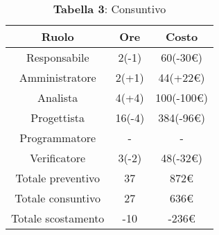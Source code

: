 \begin{table}[H]
	\centering
	\renewcommand{\arraystretch}{1.5}
	\begin{tabular}{|c|c|c|}
		\hline
		\rowcolor{lighter-grayer}
		Ruolo & Ore & Costo \\ \hline
		Responsabile & 2(-1) & 60(-30\euro) \\ \hline
		Amministratore & 2(+1) & 44(+22\euro) \\ \hline
		Analista & 4(+4) & 100(-100\euro) \\ \hline
		Progettista & 16(-4) & 384(-96\euro) \\ \hline
		Programmatore & - & - \\ \hline
		Verificatore & 3(-2) & 48(-32\euro) \\ \hline
		Totale preventivo & 37 & 872\euro \\ \hline
		Totale consuntivo & 27 & 636\euro \\ \hline
		Totale scostamento & -10 & -236\euro \\ \hline
	\end{tabular}
	\caption*{\textbf{Tabella 3}: Consuntivo\\}
\end{table}

